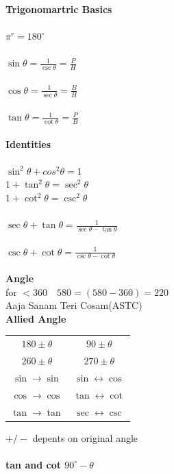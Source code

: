\documentclass[11pt,a4paper,landscape,fleqn]{article}
\begin{document}
\begin{multicols*}{3}
{\noindent \bfseries {\Large Trigonomartric Basics}}\\ \\
$\pi^r = 180^{\circ}$\\ \\
$\sin\theta = \frac{1}{\csc\theta} = \frac{P}{H}$\\ \\
$\cos\theta = \frac{1}{\sec\theta} = \frac{B}{H}$\\ \\
$\tan\theta = \frac{1}{\cot\theta} = \frac{P}{B}$\\ \\ 
{\bfseries {Identities}}\\ \\
$\sin^2\theta+ cos^2\theta = 1$\\
$1 + \tan^2\theta = \sec^2\theta$ \\
$1 + \cot^2\theta = \csc^2\theta$ \\ \\
{\indent $\sec\theta + \tan\theta = \frac{1}{\sec\theta - \tan\theta}$}\\ \\
{\indent $\csc\theta + \cot\theta = \frac{1}{\csc\theta - \cot\theta}$}\\ \\
{\bfseries {Angle}}\\
for $ < 360 \quad 580 = (580-360)=220$\\
Aaja Sanam Teri Cosam(ASTC)\\
{\bfseries {Allied Angle}}\\
\begin{center}
\begin{tabular}{|| c| c|| }
\hline
$180 \pm \theta$ & $90 \pm \theta$\\
$260 \pm \theta$ & $ 270 \pm \theta$\\[0.5 ex]
\hline
$\sin \rightarrow \sin$   &  $\sin \leftrightarrow \cos$\\
$\cos \rightarrow \cos$ & $\tan \leftrightarrow \cot $\\
$\tan \rightarrow \tan$ & $\sec \leftrightarrow \csc$\\
\hline
\end{tabular}
\end{center}
$+/-$ depents on original angle\\ \\
{\bfseries {tan and cot $90^\circ-\theta$}}\\

\end{multicols*}
\end{document}
